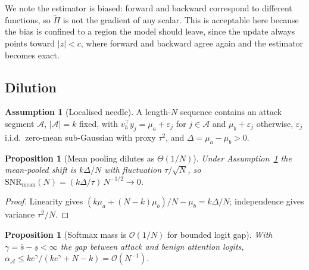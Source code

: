 \documentclass[10pt]{article}
\theoremstyle{plain}
\newtheorem{proposition}[theorem]{Proposition}
\theoremstyle{definition}
\newtheorem{assumption}[theorem]{Assumption}
\theoremstyle{remark}
\begin{document}
We note the estimator is biased: forward and backward correspond to different functions,
so $\widetilde\Pi$ is not the gradient of any scalar. This is acceptable here because the
bias is confined to a region the model should leave, since the update always points toward
$|z|<c$, where forward and backward agree again and the estimator becomes exact.

\subsection{Dilution}
\begin{assumption}[Localised needle]
\label{asm:needle}
A length-$N$ sequence contains an attack segment $\mathcal{A}$, $|\mathcal{A}|=k$ fixed,
with $v_h^\top y_j=\mu_a+\varepsilon_j$ for $j\in\mathcal{A}$ and $\mu_b+\varepsilon_j$
otherwise, $\varepsilon_j$ i.i.d.\ zero-mean sub-Gaussian with proxy $\tau^2$, and
$\Delta=\mu_a-\mu_b>0$.
\end{assumption}

\begin{proposition}[Mean pooling dilutes as $\Theta(1/N)$]
\label{prop:mean}
Under Assumption~\ref{asm:needle} the mean-pooled shift is $k\Delta/N$ with fluctuation
$\tau/\sqrt N$, so
$\mathrm{SNR}_{\mathrm{mean}}(N)=(k\Delta/\tau)\,N^{-1/2}\to0$.
\end{proposition}
\begin{proof}
Linearity gives $(k\mu_a+(N-k)\mu_b)/N-\mu_b=k\Delta/N$; independence gives variance
$\tau^2/N$.
\end{proof}

\begin{proposition}[Softmax mass is $\mathcal{O}(1/N)$ for bounded logit gap]
\label{prop:softmax}
With $\gamma=\bar s-\underline s<\infty$ the gap between attack and benign attention
logits, $\alpha_{\mathcal{A}}\le k e^{\gamma}/(ke^{\gamma}+N-k)=\mathcal{O}(N^{-1})$.
\end{proposition}
\end{document}
